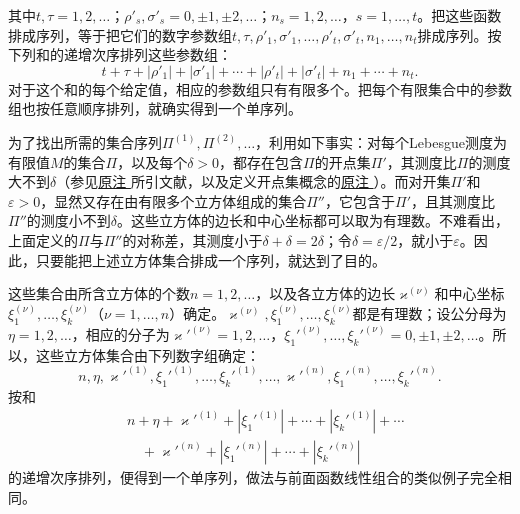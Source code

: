 \documentclass[fontsize=13pt,twoside,openany,headings=normal,parskip=false,bookmarkpackage=false,DIV=calc]{scrbook}
\begin{document}
\hypertarget{origpage-36}{}\label{origpage-36}其中$t,\allowbreak \tau=1,\allowbreak 2,\allowbreak \ldots$；$\rho'_s,\allowbreak \sigma'_s=0,\allowbreak \pm1,\allowbreak \pm2,\allowbreak \ldots$；$n_s=1,\allowbreak 2,\allowbreak \ldots$，$s=1,\allowbreak \ldots,\allowbreak t$。把这些函数排成序列，等于把它们的数字参数组$t,\allowbreak \tau,\allowbreak \rho'_1,\allowbreak \sigma'_1,\allowbreak \ldots,\allowbreak \rho'_t,\allowbreak \sigma'_t,\allowbreak n_1,\allowbreak \ldots,\allowbreak n_t$排成序列。按下列和的递增次序排列这些参数组：
\[
t+\tau+|\rho'_1|+|\sigma'_1|+\cdots+|\rho'_t|+|\sigma'_t|+n_1+\cdots+n_t.
\]
对于这个和的每个给定值，相应的参数组只有有限多个。把每个有限集合中的参数组也按任意顺序排列，就确实得到一个单序列。

为了找出所需的集合序列$\Pi^{(1)},\allowbreak \Pi^{(2)},\allowbreak \ldots$，利用如下事实：对每个Lebesgue测度为有限值$M$的集合$\Pi$，以及每个$\delta>0$，都存在包含$\Pi$的开点集$\Pi'$，其测度比$\Pi$的测度大不到$\delta$（参见\CJKglue \hyperlink{note-52}{原注 } 所引文献，以及定义开点集概念的\CJKglue \hyperlink{note-45}{原注 }）。而对开集$\Pi'$和$\varepsilon>0$，显然又存在由有限多个立方体组成的集合$\Pi''$，它包含于$\Pi'$，且其测度比$\Pi''$的测度小不到$\delta$。这些立方体的边长和中心坐标都可以取为有理数。不难看出，上面定义的$\Pi$与$\Pi''$的对称差，其测度小于$\delta+\delta=2\delta$；令$\delta=\varepsilon/2$，就小于$\varepsilon$。因此，只要能把上述立方体集合排成一个序列，就达到了目的。

这些集合由所含立方体的个数$n=1,\allowbreak 2,\allowbreak \ldots$，以及各立方体的边长$\varkappa^{(\nu)}$和中心坐标$\xi_1^{(\nu)},\allowbreak \ldots,\allowbreak \xi_k^{(\nu)}$（$\nu=1,\allowbreak \ldots,\allowbreak n$）确定。$\varkappa^{(\nu)},\allowbreak \xi_1^{(\nu)},\allowbreak \ldots,\allowbreak \xi_k^{(\nu)}$都是有理数；设公分母为$\eta=1,\allowbreak 2,\allowbreak \ldots$，相应的分子为$\varkappa'^{(\nu)}=1,\allowbreak 2,\allowbreak \ldots$，$\xi_1'^{(\nu)},\allowbreak \ldots,\allowbreak \xi_k'^{(\nu)}=0,\allowbreak \pm1,\allowbreak \pm2,\allowbreak \ldots$。所以，这些立方体集合由下列数字组确定：
\[
n,\eta,\varkappa'^{(1)},\xi_1'^{(1)},\ldots,\xi_k'^{(1)},\ldots,\varkappa'^{(n)},\xi_1'^{(n)},\ldots,\xi_k'^{(n)}.
\]
按和
\begin{align*}
&n+\eta+\varkappa'^{(1)}+|\xi_1'^{(1)}|+\cdots+|\xi_k'^{(1)}|+\cdots\\
&\quad+\varkappa'^{(n)}+|\xi_1'^{(n)}|+\cdots+|\xi_k'^{(n)}|
\end{align*}
的递增次序排列，便得到一个单序列，做法与前面函数线性组合的类似例子完全相同。
\end{document}
